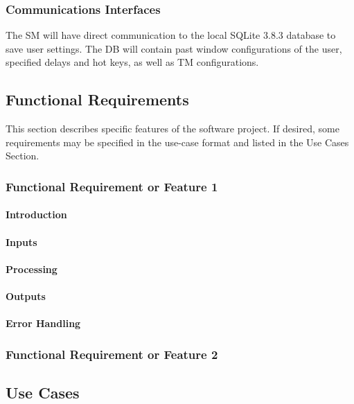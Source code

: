 \documentclass[titlepage]{article}
\begin{document}
\subsubsection{Communications Interfaces}
The SM will have direct communication to the local SQLite 3.8.3 database to save user settings. The DB will contain past window configurations of the user, specified delays and hot keys, as well as TM configurations.

\subsection{Functional Requirements}
This section describes specific features of the software project.  If desired, some requirements may be specified in the use-case format and listed in the Use Cases Section.

\subsubsection{Functional Requirement or Feature 1}

\paragraph{Introduction}

\paragraph{Inputs}

\paragraph{Processing}

\paragraph{Outputs}

\paragraph{Error Handling}

\subsubsection{Functional Requirement or Feature 2}

\subsection{Use Cases}
\end{document}
